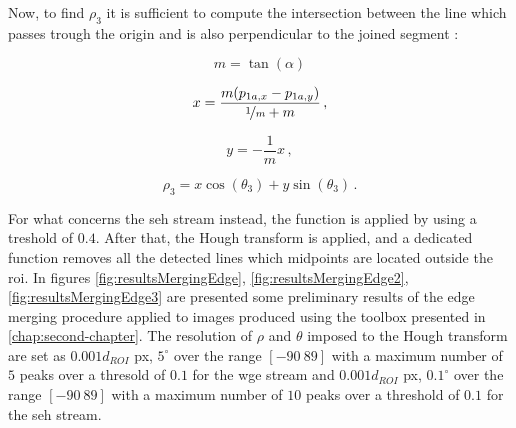 Now, to find $\rho_3$ it is sufficient to compute the intersection between the line which passes trough the origin and is also perpendicular to the joined segment :

\begin{equation}
m = \tan(\alpha)
\end{equation}

\begin{equation}
x = \frac{m(p_{1a,x}-p_{1a,y})}{\nicefrac{1}{m} + m} \,,
\end{equation}

\begin{equation}
y = - \frac{1}{m} x \,,
\end{equation}

\begin{equation}
\rho_3 = x \cos (\theta_3) +  y \sin (\theta_3) \,.
\end{equation}

For what concerns the \acrshort{seh} stream instead, the  function is applied by using a treshold of $0.4$. After that, the Hough transform is applied, and a dedicated function removes all the detected lines which midpoints are located outside the \acrshort{roi}.
In figures \ref{fig:resultsMergingEdge}, \ref{fig:resultsMergingEdge2}, \ref{fig:resultsMergingEdge3} are presented some preliminary results of the edge merging procedure applied to images produced using the toolbox presented in \ref{chap:second-chapter}. The resolution of $\rho$ and $\theta$ imposed to the Hough transform are set as $0.001 d_{ROI}$ px, $5^\circ$ over the range $[-90 \ 89]$ with a maximum number of $5$ peaks over a thresold of $0.1$ for the \acrshort{wge} stream and $0.001 d_{ROI}$ px, $0.1^\circ$ over the range $[-90 \ 89]$ with a maximum number of $10$ peaks over a threshold of $0.1$ for the \acrshort{seh} stream.

